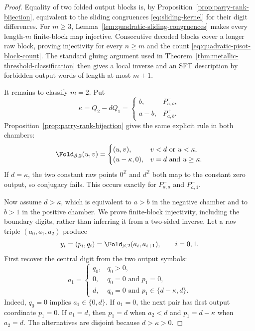 \begin{proof}
Equality of two folded output blocks is, by
Proposition~\ref{prop:parry-rank-bijection}, equivalent to the sliding
congruences \eqref{eq:sliding-kernel} for their digit differences.  For
$m\ge3$, Lemma~\ref{lem:quadratic-sliding-congruences} makes every
length-$m$ finite-block map injective.  Consecutive decoded blocks cover a
longer raw block, proving injectivity for every $n\ge m$ and the count
\eqref{eq:quadratic-pisot-block-count}.  The standard gluing argument used in
Theorem~\ref{thm:metallic-threshold-classification} then gives a local inverse
and an SFT description by forbidden output words of length at most $m+1$.

It remains to classify $m=2$.  Put
\[
\kappa=Q_2-dQ_1=
\begin{cases}b,&P^-_{a,b},\\ a-b,&P^+_{a,b}.
\end{cases}
\]
Proposition~\ref{prop:parry-rank-bijection} gives the same explicit rule in
both chambers:
\[
\Fold_{\beta,2}(u,v)=
\begin{cases}
(u,v),&v<d\text{ or }u<\kappa,\\
(u-\kappa,0),&v=d\text{ and }u\ge\kappa.
\end{cases}
\]
If $d=\kappa$, the two constant raw points
$0^{\mathbb Z}$ and $d^{\mathbb Z}$ both map to the constant zero output,
so conjugacy fails.  This occurs exactly for $P^-_{a,a}$ and $P^+_{a,1}$.

Now assume $d>\kappa$, which is equivalent to $a>b$ in the negative chamber
and to $b>1$ in the positive chamber.  We prove finite-block injectivity,
including the boundary digits, rather than inferring it from a two-sided
inverse.  Let a raw triple $(a_0,a_1,a_2)$ produce
\[
y_i=(p_i,q_i)=\Fold_{\beta,2}(a_i,a_{i+1}),\qquad i=0,1.
\]
First recover the central digit from the two output symbols:
\begin{equation}
a_1=
\begin{cases}
q_0,&q_0>0,\\
0,&q_0=0\text{ and }p_1=0,\\
d,&q_0=0\text{ and }p_1\in\{d-\kappa,d\}.
\end{cases}
\label{eq:m2-central-decoder}
\end{equation}
Indeed, $q_0=0$ implies $a_1\in\{0,d\}$.  If $a_1=0$, the next pair has
first output coordinate $p_1=0$.  If $a_1=d$, then $p_1=d$ when
$a_2<d$ and $p_1=d-\kappa$ when $a_2=d$.  The alternatives are disjoint
because $d>\kappa>0$.


\end{proof}

